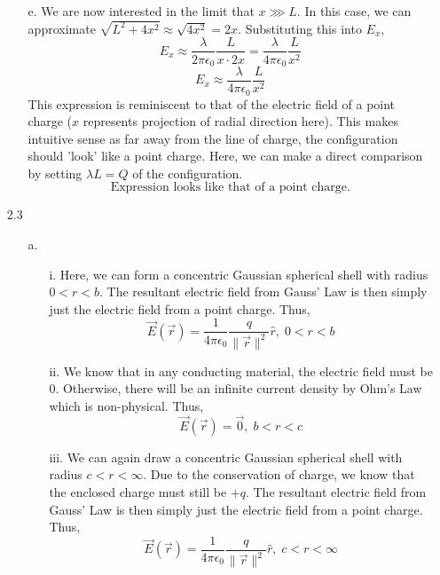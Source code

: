 \documentclass[12pt]{article}
\begin{document}
\begin{enumerate}
\begin{enumerate}
		\item [e.]
		We are now interested in the limit that $x \ggg L$.
		In this case, we can approximate $\sqrt{L^2+4x^2}\approx \sqrt{4x^2}=2x$.
		Substituting this into $E_x$,
		\[E_x \approx \frac{\lambda}{2\pi \epsilon_0}\frac{L}{x\cdot 2x}=\frac{\lambda}{4\pi \epsilon_0}\frac{L}{ x^2}\]
		\[\boxed{E_x \approx \frac{\lambda}{4\pi \epsilon_0}\frac{L}{ x^2}}\]
		This expression is reminiscent to that of the electric field of a point charge ($x$ represents projection of radial direction here).
		This makes intuitive sense as far away from the line of charge, the configuration should 'look' like a point charge.
		Here, we can make a direct comparison by setting $\lambda L = Q$ of the configuration.
		\[\boxed{\text{Expression looks like that of a point charge.}}\]

	\end{enumerate}

	\item [2.3]
	\begin{enumerate}
		\item [a.]
		\begin{enumerate}
			\item [i.]
			Here, we can form a concentric Gaussian spherical shell with radius $0<r<b$.
			The resultant electric field from Gauss' Law is then simply just the electric field from a point charge.
			Thus,
			\[\boxed{\vec E(\vec r)=\frac{1}{4\pi \epsilon_0}\frac{q}{\|\vec r\|^2}\hat r, \; 0<r<b}\]

			\item [ii.]
			We know that in any conducting material, the electric field must be 0.
			Otherwise, there will be an infinite current density by Ohm's Law which is non-physical.
			Thus,
			\[\boxed{\vec E(\vec r)=\vec 0, \; b<r<c}\]

			\item [iii.]
			We can again draw a concentric Gaussian spherical shell with radius $c<r<\infty$.
			Due to the conservation of charge, we know that the enclosed charge must still be $+q$.
			The resultant electric field from Gauss' Law is then simply just the electric field from a point charge.
			Thus,
			\[\boxed{\vec E(\vec r)=\frac{1}{4\pi \epsilon_0}\frac{q}{\|\vec r\|^2}\hat r, \; c<r<\infty}\]

		\end{enumerate}


\end{enumerate}
\end{enumerate}
\end{document}
